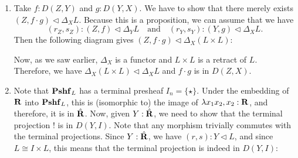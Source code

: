 \begin{enumerate}
  \item Take $ f: D(Z, Y) $ and $ g: D(Y, X) $. We have to show that there merely exists $ (Z, f \cdot g) \triangleleft \Delta_X L $. Because this is a proposition, we can assume that we have
  \[ (r_Z, s_Z) : (Z, f) \triangleleft \Delta_Y L \quad \text{and} \quad (r_Y, s_Y) : (Y, g) \triangleleft \Delta_X L. \]
  Then the following diagram gives $ (Z, f \cdot g) \triangleleft \Delta_X (L \times L) $:
    \begin{center}
    \end{center}
    Now, as we saw earlier, $ \Delta_X $ is a functor and $ L \times L $ is a retract of $ L $. Therefore, we have $ \Delta_X (L \times L) \triangleleft \Delta_X L $ and $ f \cdot g $ is in $ D(Z, X) $.



  \item Note that $ \mathbf{Pshf}_{L} $ has a terminal presheaf $ I_n = \{ \star \} $. Under the embedding of $ \mathbf{R} $ into $ \mathbf{Pshf}_{L} $, this is (isomorphic to) the image of $ \lambda x_1 x_2, x_2 : \mathbf{R} $, and therefore, it is in $ \hat {\mathbf{R}} $. Now, given $ Y : \hat {\mathbf{R}} $, we need to show that the terminal projection $ ! $ is in $ D(Y, I) $. Note that any morphism trivially commutes with the terminal projections. Since $ Y : \hat {\mathbf{R}} $, we have $ (r, s) : Y \triangleleft L $, and since $ L \cong I \times L $, this means that the terminal projection is indeed in $ D(Y, I) $:
    \begin{center}
    \end{center}
\end{enumerate}

